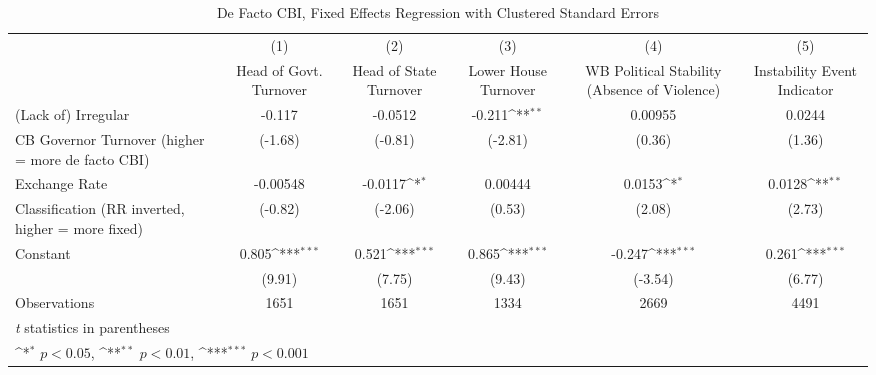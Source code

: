 \begin{table}[htbp]\centering
\def\sym#1{\ifmmode^{#1}\else\(^{#1}\)\fi}
\caption{De Facto CBI, Fixed Effects Regression with Clustered Standard Errors \label{multIndFEDF}}
\begin{tabular}{l*{5}{c}}
\hline\hline
                    &\multicolumn{1}{c}{(1)}&\multicolumn{1}{c}{(2)}&\multicolumn{1}{c}{(3)}&\multicolumn{1}{c}{(4)}&\multicolumn{1}{c}{(5)}\\
                    &\multicolumn{1}{c}{Head of Govt. Turnover}&\multicolumn{1}{c}{Head of State Turnover}&\multicolumn{1}{c}{Lower House Turnover}&\multicolumn{1}{c}{WB Political Stability (Absence of Violence)}&\multicolumn{1}{c}{Instability Event Indicator}\\
\hline
(Lack of) Irregular &      -0.117         &     -0.0512         &      -0.211\sym{**} &     0.00955         &      0.0244         \\
CB Governor Turnover (higher = more de facto CBI)&     (-1.68)         &     (-0.81)         &     (-2.81)         &      (0.36)         &      (1.36)         \\
[1em]
Exchange Rate       &    -0.00548         &     -0.0117\sym{*}  &     0.00444         &      0.0153\sym{*}  &      0.0128\sym{**} \\
Classification (RR inverted, higher = more fixed)&     (-0.82)         &     (-2.06)         &      (0.53)         &      (2.08)         &      (2.73)         \\
[1em]
Constant            &       0.805\sym{***}&       0.521\sym{***}&       0.865\sym{***}&      -0.247\sym{***}&       0.261\sym{***}\\
                    &      (9.91)         &      (7.75)         &      (9.43)         &     (-3.54)         &      (6.77)         \\
\hline
Observations        &        1651         &        1651         &        1334         &        2669         &        4491         \\
\hline\hline
\multicolumn{6}{l}{\footnotesize \textit{t} statistics in parentheses}\\
\multicolumn{6}{l}{\footnotesize \sym{*} \(p<0.05\), \sym{**} \(p<0.01\), \sym{***} \(p<0.001\)}\\
\end{tabular}
\end{table}
